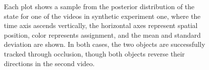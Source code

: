 \documentclass[smallcondensed, final]{svjour3}
\begin{document}
\begin{figure}
  \centering               
   \hspace{0.5mm}
   \hspace{0.5mm}
  \caption{Each plot shows a sample from the posterior distribution of the state for one of the videos in synthetic experiment one, where the time axis ascends vertically, the horizontal axes represent spatial position, color represents assignment, and the mean and standard deviation are shown. In both cases, the two objects are successfully tracked through occlusion, though both objects reverse their directions in the second video.}
  \label{fig:synth_one_plot}
\end{figure}
\end{document}
